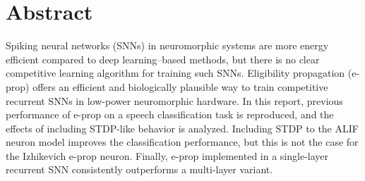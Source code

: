 \begingroup
\let\clearpage\relax
\let\cleardoublepage\relax
\let\cleardoublepage\relax

\chapter*{Abstract}
Spiking neural networks (SNNs) in neuromorphic systems are more energy efficient compared to deep learning--based methods, but there is no clear competitive learning algorithm for training such SNNs.
Eligibility propagation (e-prop) offers an efficient and biologically plausible way to train competitive recurrent SNNs in low-power neuromorphic hardware.
In this report, previous performance of e-prop on a speech classification task is reproduced, and the effects of including STDP-like behavior is analyzed.
Including STDP to the ALIF neuron model improves the classification performance, but this is not the case for the Izhikevich e-prop neuron.
Finally, e-prop implemented in a single-layer recurrent SNN consistently outperforms a multi-layer variant.

\endgroup

\vfill
